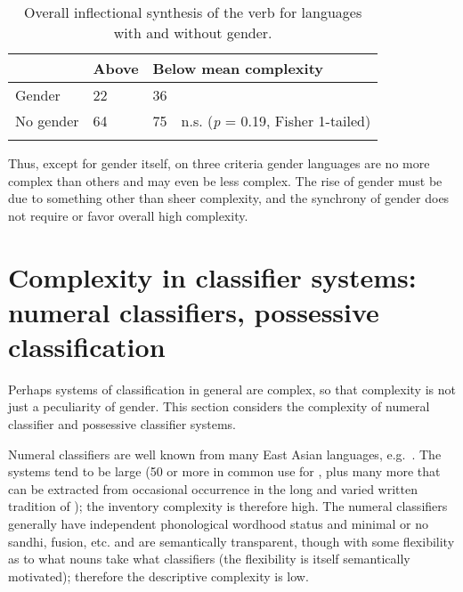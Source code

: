 \documentclass[output=collectionpaper]{langsci/langscibook}
\begin{document}
\begin{table}
\caption{Overall inflectional synthesis of the verb for languages with and without gender.}
\label{extab:Nich:11}

\begin{tabularx}{\textwidth}{p{2.7cm}Xp{1.3cm}l}
\lsptoprule
		 &	Above 	 &	\multicolumn{2}{l}{Below mean complexity} \\
			 \midrule
	Gender	 &	22	 &	36 \\
	No gender  &	64	 &	75	 &	n.s. (\textit{p} = 0.19, Fisher 1-tailed) \\
\lspbottomrule\end{tabularx}
\end{table}

  
Thus, except for gender itself, on three criteria gender languages are no more complex than others and may even be less complex. The rise of gender must be due to something other than sheer complexity, and the synchrony of gender does not require or favor overall high complexity.


\section{Complexity in classifier systems: numeral classifiers, possessive classification}
\label{sec:Nich:4}

Perhaps systems of classification in general are complex, so that complexity is not just a peculiarity of gender. This section considers the complexity of numeral classifier and possessive classifier systems.

	Numeral classifiers are well known from many East Asian languages, e.g.\ . The systems tend to be large (50 or more in common use for , plus many more that can be extracted from occasional occurrence in the long and varied written tradition of ); the inventory complexity is therefore high. The numeral classifiers generally have independent phonological wordhood status and minimal or no sandhi, fusion, etc. and are semantically transparent, though with some flexibility as to what nouns take what classifiers (the flexibility is itself semantically motivated); therefore the descriptive complexity is low.
\end{document}
